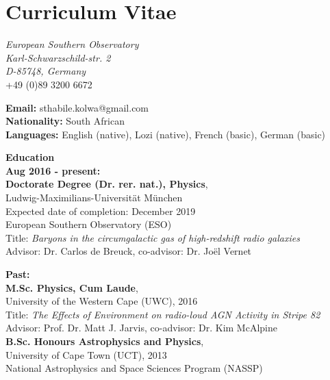 

\chapter*{Curriculum Vitae}

{\it European Southern Observatory\\
Karl-Schwarzschild-str. 2\\
D-85748, Germany} \\
+49 (0)89 3200 6672\\

\parindent 0pt 

{\bf Email:} sthabile.kolwa@gmail.com\\
{\bf Nationality:} South African\\
{\bf Languages:} English (native), Lozi (native), French (basic), German (basic)\\

\vspace*{1cm}

{\bf \Large Education} \\[1.5ex]
\normalsize{\bf Aug 2016 - present:}\\
{\bf Doctorate Degree (Dr. rer. nat.), Physics},\\
 Ludwig-Maximilians-Universit\"at M\"unchen\\
Expected date of completion: December 2019 \\ 
European Southern Observatory (ESO) \\
Title: {\it Baryons in the circumgalactic gas of high-redshift radio galaxies}\\
Advisor: Dr. Carlos de Breuck, co-advisor: Dr. Jo\"el Vernet

\vspace*{0.6cm}

\normalsize{\bf Past:}\\
{\bf M.Sc. Physics, Cum Laude},\\
 University of the Western Cape (UWC), 2016 \\				
Title: {\it The Effects of Environment on radio-loud AGN Activity in Stripe 82}\\
Advisor: Prof. Dr. Matt J. Jarvis, co-advisor: Dr. Kim McAlpine\\

{\bf B.Sc. Honours Astrophysics and Physics},\\
University of Cape Town (UCT), 2013 \\
National Astrophysics and Space Sciences Program (NASSP)

